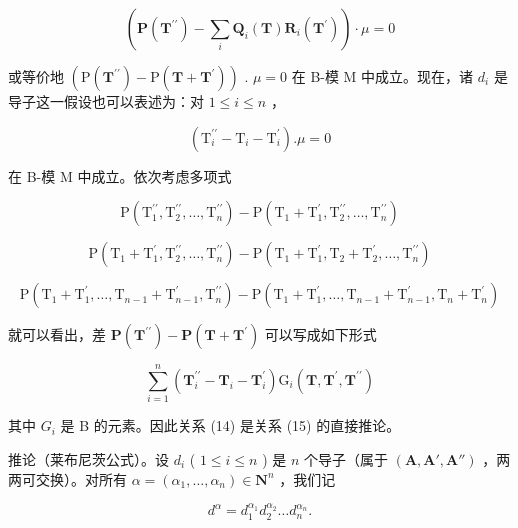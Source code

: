 \[
(\mathbf {P} (\mathbf {T} ^ {\prime \prime}) - \sum_ {i} \mathbf {Q} _ {i} (\mathbf {T}) \mathbf {R} _ {i} (\mathbf {T} ^ {\prime})) \cdot \mu = 0\tag{14}
\]

或等价地 \((\mathrm{P}(\mathbf{T}^{\prime\prime}) - \mathrm{P}(\mathbf{T} + \mathbf{T}^{\prime}))\) . \(\mu = 0\) 在 B-模 M 中成立。现在，诸 \(d_{i}\) 是导子这一假设也可以表述为：对 \(1 \leqslant i \leqslant n\) ，

\[
\left(\mathrm{T} _ {i} ^ {\prime \prime} - \mathrm{T} _ {i} - \mathrm{T} _ {i} ^ {\prime}\right). \mu = 0\tag{15}
\]

在 B-模 M 中成立。依次考虑多项式

\[
\mathrm{P} \left(\mathrm{T} _ {1} ^ {\prime \prime}, \mathrm{T} _ {2} ^ {\prime \prime}, \dots , \mathrm{T} _ {n} ^ {\prime \prime}\right) - \mathrm{P} \left(\mathrm{T} _ {1} + \mathrm{T} _ {1} ^ {\prime}, \mathrm{T} _ {2} ^ {\prime \prime}, \dots , \mathrm{T} _ {n} ^ {\prime \prime}\right)
\]

\[
\mathrm{P} \left(\mathrm{T} _ {1} + \mathrm{T} _ {1} ^ {\prime}, \mathrm{T} _ {2} ^ {\prime \prime}, \dots , \mathrm{T} _ {n} ^ {\prime \prime}\right) - \mathrm{P} \left(\mathrm{T} _ {1} + \mathrm{T} _ {1} ^ {\prime}, \mathrm{T} _ {2} + \mathrm{T} _ {2} ^ {\prime}, \dots , \mathrm{T} _ {n} ^ {\prime \prime}\right)
\]

\[
\mathrm{P} \left(\mathrm{T} _ {1} + \mathrm{T} _ {1} ^ {\prime}, \dots , \mathrm{T} _ {n - 1} + \mathrm{T} _ {n - 1} ^ {\prime}, \mathrm{T} _ {n} ^ {\prime \prime}\right) - \mathrm{P} \left(\mathrm{T} _ {1} + \mathrm{T} _ {1} ^ {\prime}, \dots , \mathrm{T} _ {n - 1} + \mathrm{T} _ {n - 1} ^ {\prime}, \mathrm{T} _ {n} + \mathrm{T} _ {n} ^ {\prime}\right)
\]

就可以看出，差 \(\mathbf{P}(\mathbf{T}^{\prime \prime}) - \mathbf{P}(\mathbf{T} + \mathbf{T}^{\prime})\) 可以写成如下形式

\[
\sum_ {i = 1} ^ {n} \left(\mathbf {T} _ {i} ^ {\prime \prime} - \mathbf {T} _ {i} - \mathbf {T} _ {i} ^ {\prime}\right) \mathrm{G} _ {i} (\mathbf {T}, \mathbf {T} ^ {\prime}, \mathbf {T} ^ {\prime \prime})
\]

其中 \(G_{i}\) 是 B 的元素。因此关系 (14) 是关系 (15) 的直接推论。

推论（莱布尼茨公式）。设 \(d_{i}\) ( \(1 \leqslant i \leqslant n\) ) 是 \(n\) 个导子（属于 \((\mathbf{A}, \mathbf{A}', \mathbf{A}'' )\) ，两两可交换）。对所有 \(\alpha = (\alpha_{1}, \ldots, \alpha_{n}) \in \mathbf{N}^{n}\) ，我们记

\[
d ^ {\alpha} = d _ {1} ^ {\alpha_ {1}} d _ {2} ^ {\alpha_ {2}} \dots d _ {n} ^ {\alpha_ {n}}.\tag{16}
\]

